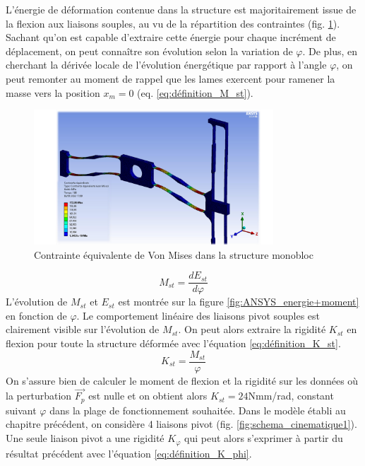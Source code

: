 L'énergie de déformation contenue dans la structure est majoritairement issue de la flexion aux liaisons souples, au vu de la répartition des contraintes (fig. \ref{fig:ANSYS_Von_Mises}). Sachant qu'on est capable d'extraire cette énergie pour chaque incrément de déplacement, on peut connaître son évolution selon la variation de $\varphi$. De plus, en cherchant la dérivée locale de l'évolution énergétique par rapport à l'angle $\varphi$, on peut remonter au moment de rappel que les lames exercent pour ramener la masse vers la position $x_m=0$ (eq. \ref{eq:définition_M_st}).
\begin{figure}[!htbp]
\begin{center}
    \captionsetup{justification=centering}
	\includegraphics[trim={3.2cm 0cm 2cm 0cm},clip, width=0.8\textwidth]{../Chap3/Figure/ANSYS_Von_Mises.pdf}
	\caption{Contrainte équivalente de Von Mises dans la structure monobloc}
	\label{fig:ANSYS_Von_Mises}
\end{center}
\end{figure}
\begin{equation}
	M_{st} = \frac{d E_{st}}{d \varphi}
	\label{eq:définition_M_st}
\end{equation}
L'évolution de $M_{st}$ et $E_{st}$ est montrée sur la figure \ref{fig:ANSYS_energie+moment} en fonction de $\varphi$. Le comportement linéaire des liaisons pivot souples est clairement visible sur l'évolution de $M_{st}$. On peut alors extraire la rigidité $K_{st}$ en flexion pour toute la structure déformée avec l'équation \ref{eq:définition_K_st}.
\begin{equation}
		K_{st} = \frac{M_{st}}{\varphi}
		\label{eq:définition_K_st}
\end{equation} 
On s'assure bien de calculer le moment de flexion et la rigidité sur les données où la perturbation $\vec{F_p}$ est nulle et on obtient alors $K_{st} = 24$Nmm/rad, constant suivant $\varphi$ dans la plage de fonctionnement souhaitée. Dans le modèle établi au chapitre précédent, on considère 4 liaisons pivot (fig. \ref{fig:schema_cinematique1}). Une seule liaison pivot a une rigidité $K_{\varphi}$ qui peut alors s'exprimer à partir du résultat précédent avec l'équation \ref{eq:définition_K_phi}.
